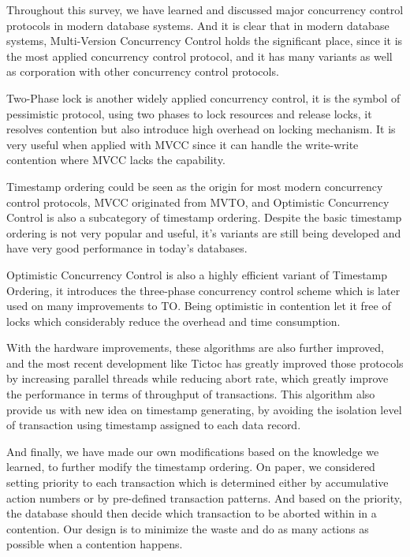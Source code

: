 Throughout this survey, we have learned and discussed major concurrency control protocols in modern database systems. And it is clear that in modern database systems, Multi-Version Concurrency Control holds the significant place, since it is the most applied concurrency control protocol, and it has many variants as well as corporation with other concurrency control protocols.

Two-Phase lock is another widely applied concurrency control, it is the symbol of pessimistic protocol, using two phases to lock resources and release locks, it resolves contention but also introduce high overhead on locking mechanism. It is very useful when applied with MVCC since it can handle the write-write contention where MVCC lacks the capability.

Timestamp ordering could be seen as the origin for most modern concurrency control protocols, MVCC originated from MVTO, and Optimistic Concurrency Control is also a subcategory of timestamp ordering. Despite the basic timestamp ordering is not very popular and useful, it's variants are still being developed and have very good performance in today's databases.

Optimistic Concurrency Control is also a highly efficient variant of Timestamp Ordering, it introduces the three-phase concurrency control scheme which is later used on many improvements to TO. Being optimistic in contention let it free of locks which considerably reduce the overhead and time consumption.

With the hardware improvements, these algorithms are also further improved, and the most recent development like Tictoc has greatly improved those protocols by increasing parallel threads while reducing abort rate, which greatly improve the performance in terms of throughput of transactions. This algorithm also provide us with new idea on timestamp generating, by avoiding the isolation level of transaction using timestamp assigned to each data record.

And finally, we have made our own modifications based on the knowledge we learned, to further modify the timestamp ordering. On paper, we considered setting priority to each transaction which is determined either by accumulative action numbers or by pre-defined transaction patterns. And based on the priority, the database should then decide which transaction to be aborted within in a contention. Our design is to minimize the waste and do as many actions as possible when a contention happens.


